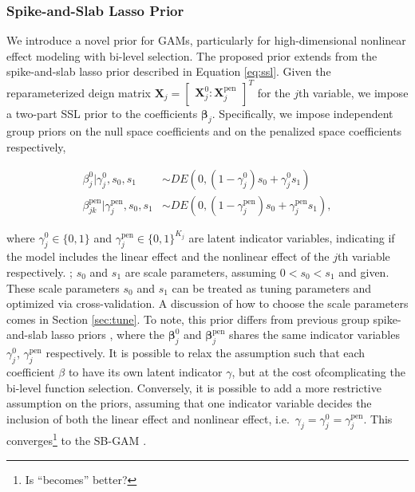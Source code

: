 \documentclass[AMA,STIX1COL,]{WileyNJD-v2}
\begin{document}
\hypertarget{spike-and-slab-lasso-prior}{%
\subsubsection{Spike-and-Slab Lasso
Prior}\label{spike-and-slab-lasso-prior}}

We introduce a novel prior for GAMs, particularly for high-dimensional
nonlinear effect modeling with bi-level selection. The proposed prior
extends from the spike-and-slab lasso prior described in Equation
\ref{eq:ssl}. Given the reparameterized deign matrix
\(\boldsymbol{X}_j = \begin{bmatrix} \boldsymbol{X}_j^0 : \boldsymbol{X}_j^\text{pen}\end{bmatrix}^T\)
for the \(j\)th variable, we impose a two-part SSL prior to the
coefficients \(\boldsymbol{\beta}_j\). Specifically, we impose
independent group priors on the null space coefficients and on the
penalized space coefficients respectively,

\begin{align}\label{eq:bham_ssl}
  \beta^0_{j} |\gamma^0_{j},s_0,s_1 &\sim DE(0,(1-\gamma^0_{j}) s_0 + \gamma^0_{j} s_1)\\
  \beta^\text{pen}_{jk} | \gamma^\text{pen}_{j},s_0,s_1 &\sim DE(0,(1-\gamma^\text{pen}_{j}) s_0 + \gamma^\text{pen}_{j} s_1), 
\end{align}

where \(\gamma^0_{j}\in\{0,1\}\) and
\(\gamma^\text{pen}_{j}\in \{0,1\}^{K_j}\) are latent indicator
variables, indicating if the model includes the linear effect and the
nonlinear effect of the \(j\)th variable respectively. ; \(s_0\) and
\(s_1\) are scale parameters, assuming \(0 < s_0 < s_1\) and given.
These scale parameters \(s_0\) and \(s_1\) can be treated as tuning
parameters and optimized via cross-validation. A discussion of how to
choose the scale parameters comes in Section \ref{sec:tune}. To note,
this prior differs from previous group spike-and-slab lasso priors
\citep{Tang2018, Tang2019}, where the \(\boldsymbol{\beta}^0_j\) and
\(\boldsymbol{\beta}^\text{pen}_j\) shares the same indicator variables
\(\gamma_j^0\), \(\gamma_j^\text{pen}\) respectively. It is possible to
relax the assumption such that each coefficient \(\beta\) to have its
own latent indicator \(\gamma\), but at the cost ofcomplicating the
bi-level function selection. Conversely, it is possible to add a more
restrictive assumption on the priors, assuming that one indicator
variable decides the inclusion of both the linear effect and nonlinear
effect, i.e.~\(\gamma_j = \gamma^0_j = \gamma^\text{pen}_j\). This
converges\footnote{Is ``becomes'' better?} to the SB-GAM
\citep{Bai2021}.
\end{document}
